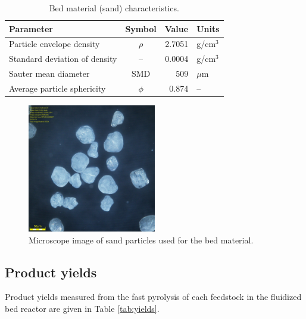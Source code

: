 \documentclass[12pt,titlepage]{article}
\begin{document}
\begin{table}[H]
    \caption{Bed material (sand) characteristics.}
    \label{tab:sand}
    \centering
    \begin{tabular}{lcrl}
        \toprule
        Parameter & Symbol & Value & Units \\
        \midrule
        Particle envelope density     & $\rho$ & 2.7051 & g/cm$^3$ \\
        Standard deviation of density & --     & 0.0004 & g/cm$^3$ \\
        Sauter mean diameter          & SMD    & 509    & $\mu$m \\
        Average particle sphericity   & $\phi$ & 0.874  & -- \\
        \bottomrule
    \end{tabular}
\end{table}

\begin{figure}[H]
    \centering
    \includegraphics[width=0.5\textwidth]{figures/sand.jpg}
    \caption{Microscope image of sand particles used for the bed material.}
    \label{fig:sand}
\end{figure}

\subsection{Product yields}

Product yields measured from the fast pyrolysis of each feedstock in the fluidized bed reactor are given in Table \ref{tab:yields}.
\end{document}
